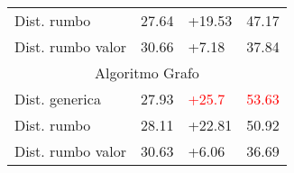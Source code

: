 \documentclass[12pt,a4paper]{article}
\begin{document}
\begin{table}[H]
\begin{tabular}{l|c|l|c|}
\rowcolor[rgb]{0.855,0.91,0.988} Dist. rumbo                           & \textcolor[rgb]{0,0.502,0}{27.64} & +19.53                             & 47.17                              \\
\rowcolor[rgb]{0.925,0.957,1} Dist. rumbo valor                        & 30.66                             & +7.18                              & 37.84                              \\ 
\hline
\multicolumn{4}{c}{{\cellcolor[rgb]{0.796,0.808,0.984}}Algoritmo Grafo}                                                                                                              \\ 
\hline
\rowcolor[rgb]{0.925,0.957,1} Dist. generica                           & 27.93                             & \textcolor{red}{+25.7}             & \textcolor{red}{53.63}             \\
\rowcolor[rgb]{0.855,0.91,0.988} Dist. rumbo                           & 28.11                             & +22.81                             & 50.92                              \\
\rowcolor[rgb]{0.925,0.957,1} Dist. rumbo valor                        & 30.63                             & +6.06                              & 36.69                             
\end{tabular}
\end{table}	
	
\end{document}
